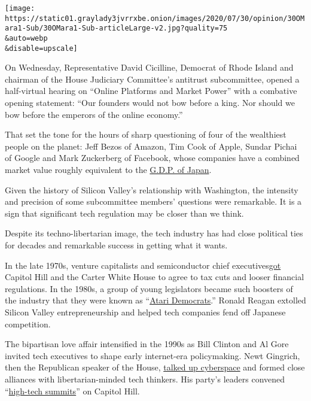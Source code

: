 \texttt{[image: https://static01.graylady3jvrrxbe.onion/images/2020/07/30/opinion/30OMara1-Sub/30OMara1-Sub-articleLarge-v2.jpg?quality=75\\\&auto=webp\\\&disable=upscale]}

On Wednesday, Representative David Cicilline, Democrat of Rhode Island
and chairman of the House Judiciary Committee's antitrust subcommittee,
opened a half-virtual hearing on ``Online Platforms and Market Power''
with a combative opening statement: ``Our founders would not bow before
a king. Nor should we bow before the emperors of the online economy.''

That set the tone for the hours of sharp questioning of four of the
wealthiest people on the planet: Jeff Bezos of Amazon, Tim Cook of
Apple, Sundar Pichai of Google and Mark Zuckerberg of Facebook, whose
companies have a combined market value roughly equivalent to the
\href{https://data.worldbank.org/indicator/NY.GDP.MKTP.CD?locations=JP}{G.D.P.
of Japan}.

Given the history of Silicon Valley's relationship with Washington, the
intensity and precision of some subcommittee members' questions were
remarkable. It is a sign that significant tech regulation may be closer
than we think.

Despite its techno-libertarian image, the tech industry has had close
political ties for decades and remarkable success in getting what it
wants.

In the late 1970s, venture capitalists and semiconductor chief
executives\href{https://books.google.com/books/about/H_R_9549_the_Capital_Investment_and_Busi.html?id=tG3SAAAAMAAJ}{got}
Capitol Hill and the Carter White House to agree to tax cuts and looser
financial regulations. In the 1980s, a group of young legislators became
such boosters of the industry that they were known as
``\href{https://www.nytimes3xbfgragh.onion/1982/09/26/business/designing-a-new-economics-for-the-atari-democrats.html}{Atari
Democrats}.'' Ronald Reagan extolled Silicon Valley entrepreneurship and
helped tech companies fend off Japanese competition.

The bipartisan love affair intensified in the 1990s as Bill Clinton and
Al Gore invited tech executives to shape early internet-era
policymaking. Newt Gingrich, then the Republican speaker of the House,
\href{https://www.nytimes3xbfgragh.onion/1995/01/17/opinion/mr-gingrichs-cyberrevolution.html?searchResultPosition=1}{talked
up cyberspace} and formed close alliances with libertarian-minded tech
thinkers. His party's leaders convened
``\href{https://www.nytimes3xbfgragh.onion/1999/06/16/business/gates-testifies-and-the-republicans-seek-to-forge-closer-links.html?searchResultPosition=24}{high-tech
summits}'' on Capitol Hill.

